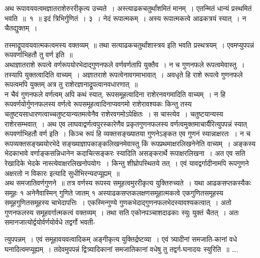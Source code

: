 \documentclass[11pt, openany]{book}
\begin{document}
\vspace{-3mm}
 अथ रूपावयवत्वमज्ञातराशेरुररीकृत्य उच्यते~। अस्त्याढकचतुर्थांशमितं 
मानम्~। एतन्मितं धान्यं प्रस्थमितं भवति~॥~१~॥ इदं त्रिभिर्गुणितं~। ३~। 
नेदं रूपात्मकम्~। अस्य रूपात्मकत्वे आढकत्रयं स्यात्~। न चैतद्युक्तम्~।

\newpage

\noindent तस्माद्रूपावयवात्मकत्वमस्य वक्तव्यम्~॥ तथा सत्याढकचतुर्थांशास्त्रय इति भवति प्रस्थत्रयम्~। एवमप्युपपन्नं रूपवर्णाभिहतौ तु वर्ण इति~॥ \\

\vspace{-3mm}
 अथाज्ञातराशे रूपत्वे वर्णरूपयोरभेदाद्गुणनफले वर्णवर्णतापि युक्तैव~। 
न च गुणनफले रूपत्वमेवास्तु~। तस्यापि युक्तत्वादिति वाच्यम्~। अज्ञातराशे 
रूपत्वेनावगमाभावात्~। अवधृते हि राशे रूपत्वे गुणनफले रूपत्वमपि 
युक्तम् अत्र तु राशेरज्ञानाद्रूपत्वानवधारणात्~॥ \\

\vspace{-3mm}
 न चैवं गुणनफले वर्णत्वम् अपि कथं स्यात्, रूपसमूहत्वादिना राशेरनवगमादिति वाच्यम्~। न हि रूपवर्णयोर्गुणनफलस्य वर्णत्वे रूपसमूहत्वादिनाप्यवगमो राशेरावश्यकः किन्तु तस्य चतुष्टयसाधारणत्वाच्चतुष्टयान्यतमत्वेनैव राशेरवगमोऽपेक्षितः~। स चास्त्येव~। चतुष्टयान्यस्य राशेरसम्भवात्~। अथ एव लाघवाद्वर्णत्वपुरस्कारेणैव प्रकृतगुणनफलस्य
वर्णत्वमुक्तमाचार्यैरित्युपपन्नं स्यात् रूपवर्णाभिहतौ वर्ण इति~। किञ्च रूपं हि व्यक्तसङ्ख्यातया गुणनेऽङ्कत एव गुणनं स्यान्नाक्षरतः~। न च रूपव्यक्तसङ्ख्ययोरभेदे
सङ्ख्याज्ञापकाङ्कलिखनमेवास्तु किं रूपप्रथमाक्षरलिखनेनेति वाच्यम्~। अङ्कस्य भेदकाभावे वर्णाङ्कसन्निधानेन कदाचित्सङ्करः स्यादिति असङ्करार्थे रूपाक्षरलिखना~। अत एव सति रेखादिके भेदके नास्त्येवाक्षरलिखनोपयोगः~। 
किन्तु शीघ्रोपस्थितये तत्~। एवं यावद्वर्गादीनामपि रूपगुणने अक्षरतो न 
विकारः इत्यादि सुधीभिरन्यदप्यूह्यम्~॥ \\

\vspace{-3mm}
 अथ समजातिवर्णगुणने~॥ तत्र वर्णस्य रूपस्य समूहत्वमुररीकृत्य युक्तिरुच्यते~। यथा आढकसप्तकस्यैकः समूहः १ अनेनैवास्मिन् गुणिते जातम् १ अस्याढकसप्तकलक्षणसमूहात्मकत्वे एकगुणितसमूहस्य समूहगुणितसमूहस्य चाभेदापत्तिः~। एकस्मिन्गुण्ये गुणकभेदाद्गुणनफलभेदस्यावश्यकत्वात्~। अतो गुणनफलस्य समूहवर्गात्मकत्वं वक्तव्यम्~। तथा सति एकोनपञ्चाशदाढकाः स्युः युक्तं चैतत्~। अतः समानजात्योर्द्वयोर्वर्णयोर्वधे तद्वर्गो भवती-

\newpage

\noindent त्युपपन्नम्~। एवं समूहावयवत्वादिकम् अङ्गीकृत्य युक्तिर्द्रष्टव्या~। एवं
त्र्यादीनां समजाति-कानां वधे घनादित्वमप्यूह्यम्~। तदेवमुपपन्नं द्वित्र्यादिकानां
समजातिकानां वधेषु तु तद्वर्ग-घनादयः स्युरिति~॥ \ldots.\\
\end{document}
